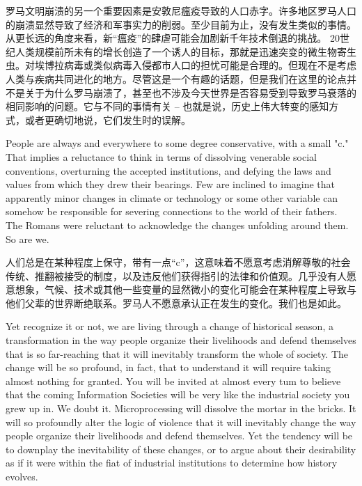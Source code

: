 \begin{Parallel}{97mm}{45mm}
  \ParallelRText
  {罗马文明崩溃的另一个重要因素是安敦尼瘟疫导致的人口赤字。许多地区罗马人口的崩溃显然导致了经济和军事实力的削弱。至少目前为止，没有发生类似的事情。从更长远的角度来看，新“瘟疫”的肆虐可能会加剧新千年技术倒退的挑战。 20世纪人类规模前所未有的增长创造了一个诱人的目标，那就是迅速突变的微生物寄生虫。对埃博拉病毒或类似病毒入侵都市人口的担忧可能是合理的。但现在不是考虑人类与疾病共同进化的地方。尽管这是一个有趣的话题，但是我们在这里的论点并不是关于为什么罗马崩溃了，甚至也不涉及今天世界是否容易受到导致罗马衰落的相同影响的问题。它与不同的事情有关 -- 也就是说，历史上伟大转变的感知方式，或者更确切地说，它们发生时的误解。
  }
  \ParallelPar



  \ParallelLText
  {People are always and everywhere to some degree conservative, with a small "c." That implies a reluctance to think in terms of dissolving venerable social conventions, overturning the accepted institutions, and defying the laws and values from which they drew their bearings. Few are inclined to imagine that apparently minor changes in climate or technology or some other variable can somehow be responsible for severing connections to the world of their fathers. The Romans were reluctant to acknowledge the changes unfolding around them. So are we.}
  
  \ParallelRText
  {人们总是在某种程度上保守，带有一点“c”，这意味着不愿意考虑消解尊敬的社会传统、推翻被接受的制度，以及违反他们获得指引的法律和价值观。几乎没有人愿意想象，气候、技术或其他一些变量的显然微小的变化可能会在某种程度上导致与他们父辈的世界断绝联系。罗马人不愿意承认正在发生的变化。我们也是如此。}
  \ParallelPar



  \ParallelLText
  {Yet recognize it or not, we are living through a change of historical season, a transformation in the way people organize their livelihoods and defend themselves that is so far-reaching that it will inevitably transform the whole of society. The change will be so profound, in fact, that to understand it will require taking almost nothing for granted. You will be invited at almost every tum to believe that the coming Information Societies will be very like the industrial society you grew up in. We doubt it. Microprocessing will dissolve the mortar in the bricks. It will so profoundly alter the logic of violence that it will inevitably change the way people organize their livelihoods and defend themselves. Yet the tendency will be to downplay the inevitability of these changes, or to argue about their desirability as if it were within the fiat of industrial institutions to determine how history evolves.}
  

\end{Parallel}
